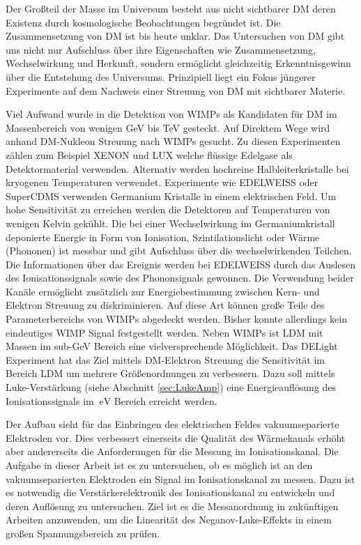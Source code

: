 Der Großteil der Masse im Universum besteht aus nicht sichtbarer \ac{DM} deren Existenz durch kosmologische Beobachtungen begründet ist.
Die Zusammensetzung von \acs{DM} ist bis heute unklar. 
Das Untersuchen von \acs{DM} gibt uns nicht nur Aufschluss über ihre Eigenschaften wie Zusammensetzung, Wechselwirkung und Herkunft, sondern ermöglicht gleichzeitig Erkenntnisgewinn über die Entstehung des Universums.
Prinzipiell liegt ein Fokus jüngerer Experimente auf dem Nachweis einer Streuung von \ac{DM} mit sichtbarer Materie. 

Viel Aufwand wurde in die Detektion von \acp{WIMP} als Kandidaten für DM im Massenbereich von wenigen GeV bis TeV gesteckt.
Auf Direktem Wege wird anhand \ac{DM}-Nukleon Streuung nach \acp{WIMP} gesucht.
Zu diesen Experimenten zählen zum Beispiel \acs{XENON}\cite{Aprile2017} und \acs{LUX}\cite{DaSilva2017} welche flüssige Edelgase als Detektormaterial verwenden.
Alternativ werden hochreine Halbleiterkristalle bei kryogenen Temperaturen verwendet.
Experimente wie \acs{EDELWEISS}\cite{EDWIII} oder \acs{SuperCDMS}\cite{Agnese2018} verwenden Germanium Kristalle in einem elektrischen Feld.
Um hohe Sensitivität zu erreichen werden die Detektoren auf Temperaturen von wenigen Kelvin gekühlt.
Die bei einer Wechselwirkung im Germaniumkristall deponierte Energie in Form von Ionisation, Szintilationslicht oder Wärme (Phononen) ist messbar und gibt Aufschluss über die wechselwirkenden Teilchen. 
Die Informationen über das Ereignis werden bei EDELWEISS durch das Auslesen des Ionisationssignals sowie des Phononsignals gewonnen.
Die Verwendung beider Kanäle ermöglicht zusätzlich zur Energiebestimmung zwischen Kern- und Elektron Streuung zu diskriminieren.
Auf diese Art können große Teile des Parameterbereichs von \acp{WIMP} abgedeckt werden.
Bisher konnte allerdings kein eindeutiges \ac{WIMP} Signal festgestellt werden.
Neben \acp{WIMP} ist \ac{LDM} mit Massen im sub-GeV Bereich eine vielversprechende Möglichkeit.
Das DELight Experiment hat das Ziel mittels \ac{DM}-Elektron Streuung die Sensitivität im Bereich \ac{LDM} um mehrere Größenordnungen zu verbessern.
Dazu soll mittels Luke-Verstärkung (siehe Abschnitt \ref{sec:LukeAmp}) eine Energieauflösung des Ionisationssignals im $\SI{}{\electronvolt}$ Bereich erreicht werden.

Der Aufbau sieht für das Einbringen des elektrischen Feldes vakuumseparierte Elektroden vor.
Dies verbessert einerseits die Qualität des Wärmekanals erhöht aber andererseits die Anforderungen für die Messung im Ionisationskanal.
Die Aufgabe in dieser Arbeit ist es zu untersuchen, ob es möglich ist an den vakuumseparierten Elektroden ein Signal im Ionisationskanal zu messen.
Dazu ist es notwendig die Verstärkerelektronik des Ionisationskanal zu entwickeln und deren Auflösung zu untersuchen.
Ziel ist es die Messanordnung in zukünftigen Arbeiten anzuwenden, um die Linearität des Neganov-Luke-Effekts in einem großen Spannungsbereich zu prüfen.


